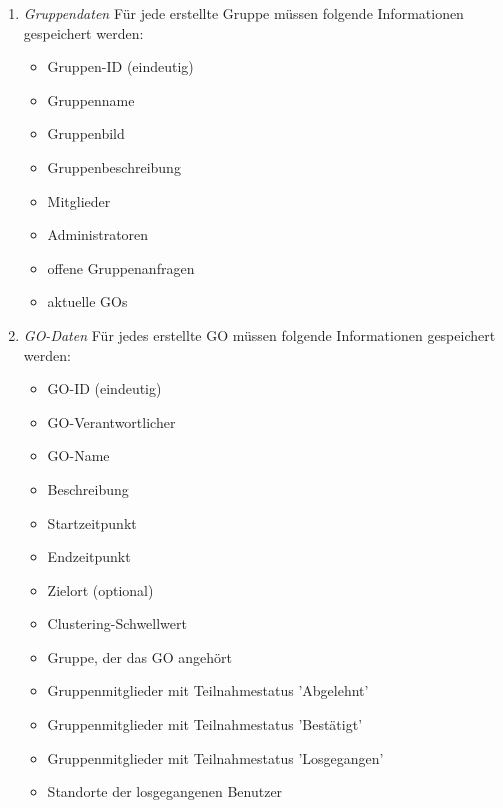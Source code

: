 \documentclass[parskip=full]{scrartcl}
\def\threedigits#1{%
  \ifnum#1<100 0\fi
  \ifnum#1<10 0\fi
  \number#1}
\begin{document}
\begin{enumerate}[label={\textbf{/D\protect\threedigits{\theenumi}0/}}, leftmargin=*]
	\item \textit{Gruppendaten} Für jede erstellte Gruppe müssen folgende Informationen gespeichert werden:
	\begin{itemize}
		\item Gruppen-ID (eindeutig)
		\item Gruppenname
		\item Gruppenbild
		\item Gruppenbeschreibung
		\item Mitglieder
		\item Administratoren
		\item offene Gruppenanfragen %
		\item aktuelle GOs
	\end{itemize}
	\item \textit{GO-Daten} \label{GO-Daten}
	Für jedes erstellte GO müssen folgende Informationen gespeichert werden:
	\begin{itemize}
		\item GO-ID (eindeutig)
		\item GO-Verantwortlicher
		\item GO-Name
		\item Beschreibung
		\item Startzeitpunkt
		\item Endzeitpunkt
		\item Zielort (optional)
		\item Clustering-Schwellwert
		\item Gruppe, der das GO angehört
		\item Gruppenmitglieder mit Teilnahmestatus 'Abgelehnt'
		\item Gruppenmitglieder mit Teilnahmestatus 'Bestätigt'
		\item Gruppenmitglieder mit Teilnahmestatus 'Losgegangen'
		\item Standorte der losgegangenen Benutzer
	\end{itemize}
\end{enumerate}

\newpage
\end{document}
